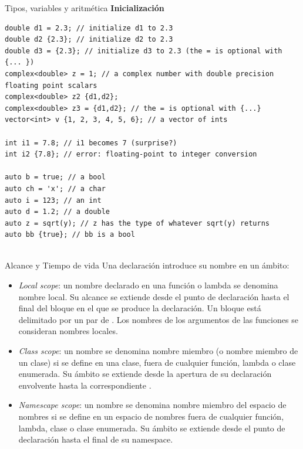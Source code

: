 \documentclass[11pt]{beamer}
\begin{document}
	
	\begin{frame}[fragile]{Tipos, variables y aritmética}
	\textbf{Inicialización}
	\begin{lstlisting}	
double d1 = 2.3; // initialize d1 to 2.3
double d2 {2.3}; // initialize d2 to 2.3
double d3 = {2.3}; // initialize d3 to 2.3 (the = is optional with {... })
complex<double> z = 1; // a complex number with double precision floating point scalars
complex<double> z2 {d1,d2};
complex<double> z3 = {d1,d2}; // the = is optional with {...}
vector<int> v {1, 2, 3, 4, 5, 6}; // a vector of ints

int i1 = 7.8; // i1 becomes 7 (surprise?)
int i2 {7.8}; // error: floating-point to integer conversion

auto b = true; // a bool
auto ch = 'x'; // a char
auto i = 123; // an int
auto d = 1.2; // a double
auto z = sqrt(y); // z has the type of whatever sqrt(y) returns
auto bb {true}; // bb is a bool
	
	\end{lstlisting}
	
	\end{frame}
	
	\begin{frame}{Alcance y Tiempo de vida}
		\small
	Una declaración introduce su nombre en un ámbito:
	\begin{itemize}
		\item \textit{Local scope}: un nombre declarado en una función o lambda se denomina nombre local. Su alcance se extiende desde el punto de declaración hasta el final del bloque en el que se produce la declaración. Un bloque está delimitado por un par de {}. Los nombres de los argumentos de las funciones se consideran
		nombres locales.
		\item \textit{Class scope}: un nombre se denomina nombre miembro (o nombre miembro de un clase) si se define en una
		clase, fuera de cualquier función, lambda o clase enumerada. Su ámbito se extiende desde la apertura { de su declaración envolvente hasta la correspondiente }.
		\item \textit{Namescape scope}: un nombre se denomina nombre miembro del espacio de nombres si se define en un espacio de nombres fuera de cualquier función, lambda, clase o clase enumerada. Su ámbito se extiende desde el punto de declaración hasta el final de su namespace.
		
	\end{itemize}

	\end{frame}
	
\end{document}

